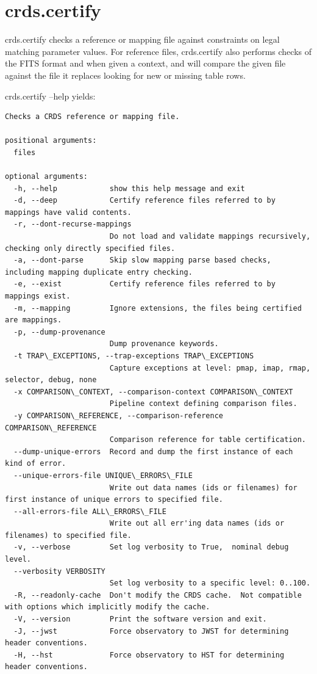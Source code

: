 \documentclass[letterpaper,10pt,english]{sphinxmanual}
\begin{document}
\section{crds.certify}
\label{command_line_tools:crds-certify}
crds.certify checks a reference or mapping file against constraints on legal
matching parameter values.   For reference files,  crds.certify also performs checks
of the FITS format and when given a context,  and will compare the given file against
the file it replaces looking for new or missing table rows.

crds.certify --help yields:

\begin{Verbatim}[commandchars=\\\{\}]
Checks a CRDS reference or mapping file.

positional arguments:
  files

optional arguments:
  -h, --help            show this help message and exit
  -d, --deep            Certify reference files referred to by mappings have valid contents.
  -r, --dont-recurse-mappings
                        Do not load and validate mappings recursively,  checking only directly specified files.
  -a, --dont-parse      Skip slow mapping parse based checks,  including mapping duplicate entry checking.
  -e, --exist           Certify reference files referred to by mappings exist.
  -m, --mapping         Ignore extensions, the files being certified are mappings.
  -p, --dump-provenance
                        Dump provenance keywords.
  -t TRAP\_EXCEPTIONS, --trap-exceptions TRAP\_EXCEPTIONS
                        Capture exceptions at level: pmap, imap, rmap, selector, debug, none
  -x COMPARISON\_CONTEXT, --comparison-context COMPARISON\_CONTEXT
                        Pipeline context defining comparison files.
  -y COMPARISON\_REFERENCE, --comparison-reference COMPARISON\_REFERENCE
                        Comparison reference for table certification.
  --dump-unique-errors  Record and dump the first instance of each kind of error.
  --unique-errors-file UNIQUE\_ERRORS\_FILE
                        Write out data names (ids or filenames) for first instance of unique errors to specified file.
  --all-errors-file ALL\_ERRORS\_FILE
                        Write out all err'ing data names (ids or filenames) to specified file.
  -v, --verbose         Set log verbosity to True,  nominal debug level.
  --verbosity VERBOSITY
                        Set log verbosity to a specific level: 0..100.
  -R, --readonly-cache  Don't modify the CRDS cache.  Not compatible with options which implicitly modify the cache.
  -V, --version         Print the software version and exit.
  -J, --jwst            Force observatory to JWST for determining header conventions.
  -H, --hst             Force observatory to HST for determining header conventions.
\end{Verbatim}
\end{document}
